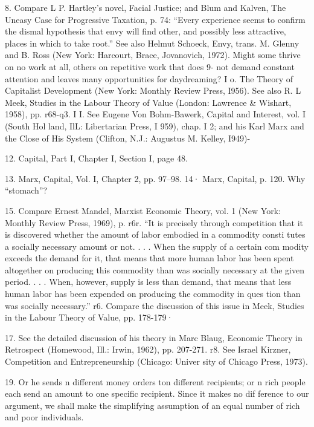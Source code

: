 \documentclass[11pt,openany]{book}
\begin{document}
{8. Compare L P. Hartley's novel, Facial Justice; and Blum and Kalven, The Uneasy Case for Progressive Taxation, p. 74: ``Every experience seems to confirm the dismal hypothesis that envy will find other, and possibly less attractive, places in which to take root.'' See also Helmut Schoeck, Envy, trans. M. Glenny and B. Ross (New York: Harcourt, Brace, Jovanovich, 1972). Might some thrive on no work at all, others on repetitive work that does 9- not demand constant attention and leaves many opportunities for daydreaming? I o. The Theory of Capitalist Development (New York: Monthly Review Press, I956). See also R. L Meek, Studies in the Labour Theory of Value (London: Lawrence \& Wishart, 1958), pp. r68-q3. I I. See Eugene Von Bohm-Bawerk, Capital and Interest, vol. I (South Hol land, IlL: Libertarian Press, I 959), chap. I 2; and his Karl Marx and the Close of His System (Clifton, N.J.: Augustus M. Kelley, I949)-\par

12. Capital, Part I, Chapter I, Section I, page 48.\par

13. Marx, Capital, Vol. I, Chapter 2, pp. 97--98. 14· Marx, Capital, p. 120. Why ``stomach''?\par

15. Compare Ernest Mandel, Marxist Economic Theory, vol. 1 (New York: Monthly Review Press, 1969), p. r6r. ``It is precisely through competition that it is discovered whether the amount of labor embodied in a commodity consti tutes a socially necessary amount or not. . . . When the supply of a certain com modity exceeds the demand for it, that means that more human labor has been spent altogether on producing this commodity than was socially necessary at the given period. . . . When, however, supply is less than demand, that means that less human labor has been expended on producing the commodity in ques tion than was socially necessary.'' r6. Compare the discussion of this issue in Meek, Studies in the Labour Theory of Value, pp. 178-179·\par

17. See the detailed discussion of his theory in Marc Blaug, Economic Theory in Retrospect (Homewood, Ill.: Irwin, 1962), pp. 207-271. r8. See Israel Kirzner, Competition and Entrepreneurship (Chicago: Univer sity of Chicago Press, 1973).\par

19. Or he sends n different money orders ton different recipients; or n rich people each send an amount to one specific recipient. Since it makes no dif ference to our argument, we shall make the simplifying assumption of an equal number of rich and poor individuals.\par

}
\end{document}
